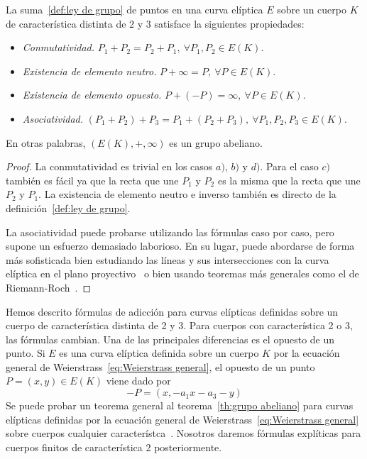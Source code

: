 \begin{teorema}\label{th:grupo abeliano}
	La suma~\ref{def:ley de grupo} de puntos en una curva elíptica $E$ sobre un cuerpo $K$ de característica distinta de 2 y 3 satisface la siguientes propiedades:
	\begin{itemize}
		\item \emph{Conmutatividad.} $P_1 + P_2 = P_2 + P_1,\ \forall P_1, P_2 \in E(K)$.
		\item \emph{Existencia de elemento neutro.} $P + \infty = P,\ \forall P \in E(K)$.
		\item \emph{Existencia de elemento opuesto.} $P + (-P) = \infty,\ \forall P \in E(K)$.
		\item \emph{Asociatividad.} $(P_1 + P_2) + P_3 = P_1 + (P_2 + P_3),\ \forall P_1, P_2, P_3 \in E(K)$.
	\end{itemize}
	En otras palabras, $(E(K), +, \infty)$ es un grupo abeliano.
\end{teorema}
\begin{proof}
La conmutatividad es trivial en los casos $a)$, $b)$ y $d)$. Para el caso $c)$ también es fácil ya que la recta que une $P_1$ y $P_2$ es la misma que la recta que une $P_2$ y $P_1$. La existencia de elemento neutro e inverso también es directo de la definición~\ref{def:ley de grupo}.

La asociatividad puede probarse utilizando las fórmulas caso por caso, pero supone un esfuerzo demasiado laborioso. En su lugar, puede abordarse de forma más sofisticada bien estudiando las líneas y sus intersecciones con la curva elíptica en el plano proyectivo~\cite[sec. 2.4]{Washington:2008} o bien usando teoremas más generales como el de Riemann-Roch~\cite[teo. III.3.4.e]{Silverman:2009}.
\end{proof}

Hemos descrito fórmulas de adicción para curvas elípticas definidas sobre un cuerpo de característica distinta de 2 y 3. Para cuerpos con característica 2 o 3, las fórmulas cambian. Una de las principales diferencias es el opuesto de un punto. Si $E$ es una curva elíptica definida sobre un cuerpo $K$ por la ecuación general de Weierstrass~\eqref{eq:Weierstrass general}, el opuesto de un punto $P = (x, y) \in E(K)$ viene dado por
$$
	- P = (x, -a_1 x - a_3 - y)
$$
Se puede probar un teorema general al teorema~\ref{th:grupo abeliano} para curvas elípticas definidas por la ecuación general de Weierstrass~\eqref{eq:Weierstrass general} sobre cuerpos cualquier característca~\cite{Silverman:2009}. Nosotros daremos fórmulas explíticas para cuerpos finitos de característica 2 posteriormente.

